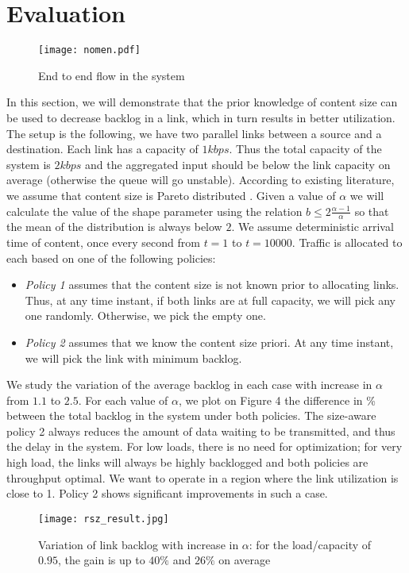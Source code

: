 \documentclass[conference]{IEEEtran}
\begin{document}
\section{Evaluation}
\label{sec:eval}
\begin{figure*}
\centering
\texttt{[image: nomen.pdf]}
\caption{End to end flow in the system}
\label{fig:network}
\end{figure*}
In this section, we will demonstrate that the prior knowledge of content size can be used to decrease backlog in a link, which in turn results in better utilization. The setup is the following, we have two parallel links between a source and a destination. Each link has a capacity of $1kbps$. Thus the total capacity of the system is $2kbps$ and the aggregated input should be below the link capacity on average (otherwise the queue will go unstable). According to existing literature, we assume that content size is Pareto distributed \cite{Arlitt97}. Given a value of $\alpha$ we will calculate the value of the shape parameter using the relation $b \le 2\frac{\alpha - 1}{\alpha}$ so that the mean of the distribution is always below $2$. We assume deterministic arrival time of content, once every second from $t=1$ to $t=10000$. Traffic is allocated to each based on one of the following policies:
\begin{itemize}
\item \emph{Policy 1} assumes that the content size is not known prior to allocating links. Thus, at any time instant, if both links are at full capacity, we will pick any one randomly. Otherwise, we pick the empty one.
\item \emph{Policy 2} assumes that we know the content size priori. At any time instant, we will pick the link with minimum backlog.
\end{itemize}
We study the variation of the average backlog in each case with increase in $\alpha$ from $1.1$ to $2.5$. For each value of $\alpha$, we plot on Figure 4 the
difference in \% between the total backlog in the system under
both policies. The size-aware policy 2 always reduces the
amount of data waiting to be transmitted, and thus the delay in
the system. For low loads, there is no need for optimization;
for very high load, the links will always be highly backlogged
and both policies are throughput optimal. We want to operate
in a region where the link utilization is close to 1. Policy 2
shows significant improvements in such a case.
\begin{figure}
\centering
\texttt{[image: rsz\_result.jpg]}
\caption{Variation of link backlog with increase in $\alpha$: for the load/capacity
of $0.95$, the gain is up to $40\%$ and $26\%$ on average}
\label{fig:result}
\end{figure}
\end{document}
